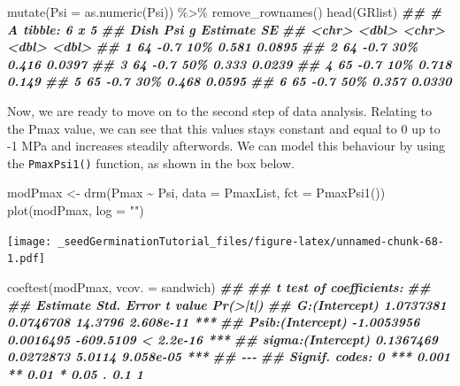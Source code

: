 \documentclass[
]{book}
\newenvironment{Shaded}{\begin{snugshade}}{\end{snugshade}}
\newcommand{\AttributeTok}[1]{\textcolor[rgb]{0.77,0.63,0.00}{#1}}
\newcommand{\DocumentationTok}[1]{\textcolor[rgb]{0.56,0.35,0.01}{\textbf{\textit{#1}}}}
\newcommand{\FunctionTok}[1]{\textcolor[rgb]{0.00,0.00,0.00}{#1}}
\newcommand{\NormalTok}[1]{#1}
\newcommand{\OtherTok}[1]{\textcolor[rgb]{0.56,0.35,0.01}{#1}}
\newcommand{\SpecialCharTok}[1]{\textcolor[rgb]{0.00,0.00,0.00}{#1}}
\newcommand{\StringTok}[1]{\textcolor[rgb]{0.31,0.60,0.02}{#1}}
\begin{document}
\begin{Shaded}
\begin{Highlighting}[]
  \FunctionTok{mutate}\NormalTok{(}\AttributeTok{Psi =} \FunctionTok{as.numeric}\NormalTok{(Psi)) }\SpecialCharTok{\%\textgreater{}\%} 
  \FunctionTok{remove\_rownames}\NormalTok{()}
\FunctionTok{head}\NormalTok{(GRlist)}
\DocumentationTok{\#\# \# A tibble: 6 x 5}
\DocumentationTok{\#\#   Dish    Psi g     Estimate     SE}
\DocumentationTok{\#\#   \textless{}chr\textgreater{} \textless{}dbl\textgreater{} \textless{}chr\textgreater{}    \textless{}dbl\textgreater{}  \textless{}dbl\textgreater{}}
\DocumentationTok{\#\# 1 64     {-}0.7 10\%      0.581 0.0895}
\DocumentationTok{\#\# 2 64     {-}0.7 30\%      0.416 0.0397}
\DocumentationTok{\#\# 3 64     {-}0.7 50\%      0.333 0.0239}
\DocumentationTok{\#\# 4 65     {-}0.7 10\%      0.718 0.149 }
\DocumentationTok{\#\# 5 65     {-}0.7 30\%      0.468 0.0595}
\DocumentationTok{\#\# 6 65     {-}0.7 50\%      0.357 0.0330}
\end{Highlighting}
\end{Shaded}

Now, we are ready to move on to the second step of data analysis. Relating to the Pmax value, we can see that this values stays constant and equal to 0 up to -1 MPa and increases steadily afterwords. We can model this behaviour by using the \texttt{PmaxPsi1()} function, as shown in the box below.

\begin{Shaded}
\begin{Highlighting}[]
\NormalTok{modPmax }\OtherTok{\textless{}{-}} \FunctionTok{drm}\NormalTok{(Pmax }\SpecialCharTok{\textasciitilde{}}\NormalTok{ Psi, }\AttributeTok{data =}\NormalTok{ PmaxList,}
               \AttributeTok{fct =} \FunctionTok{PmaxPsi1}\NormalTok{())}
\FunctionTok{plot}\NormalTok{(modPmax, }\AttributeTok{log =} \StringTok{""}\NormalTok{)}
\end{Highlighting}
\end{Shaded}

\texttt{[image: \_seedGerminationTutorial\_files/figure-latex/unnamed-chunk-68-1.pdf]}

\begin{Shaded}
\begin{Highlighting}[]
\FunctionTok{coeftest}\NormalTok{(modPmax, }\AttributeTok{vcov. =}\NormalTok{ sandwich)}
\DocumentationTok{\#\# }
\DocumentationTok{\#\# t test of coefficients:}
\DocumentationTok{\#\# }
\DocumentationTok{\#\#                     Estimate Std. Error   t value  Pr(\textgreater{}|t|)    }
\DocumentationTok{\#\# G:(Intercept)      1.0737381  0.0746708   14.3796 2.608e{-}11 ***}
\DocumentationTok{\#\# Psib:(Intercept)  {-}1.0053956  0.0016495 {-}609.5109 \textless{} 2.2e{-}16 ***}
\DocumentationTok{\#\# sigma:(Intercept)  0.1367469  0.0272873    5.0114 9.058e{-}05 ***}
\DocumentationTok{\#\# {-}{-}{-}}
\DocumentationTok{\#\# Signif. codes:  0 \textquotesingle{}***\textquotesingle{} 0.001 \textquotesingle{}**\textquotesingle{} 0.01 \textquotesingle{}*\textquotesingle{} 0.05 \textquotesingle{}.\textquotesingle{} 0.1 \textquotesingle{} \textquotesingle{} 1}
\end{Highlighting}
\end{Shaded}
\end{document}

